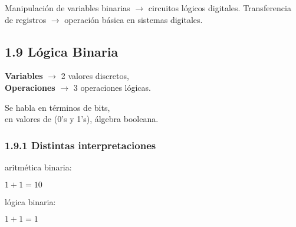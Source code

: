 \documentclass{article}
\begin{document}
Manipulaci\'{o}n de variables binarias $\rightarrow$ circuitos l\'{o}gicos digitales.
\medbreak
Transferencia de registros $\rightarrow$ operaci\'{o}n b\'{a}sica en sistemas digitales.
\medbreak

\subsection*{1.9 L\'{o}gica Binaria}

\begin{center}
    \textbf{Variables} $\rightarrow$ 2 valores discretos, \\
    \textbf{Operaciones} $\rightarrow$ 3 operaciones l\'{o}gicas.
\end{center}
\medbreak

\begin{flushleft}
    Se habla en t\'{e}rminos de bits, \\
    en valores de (0's y 1's), \'{a}lgebra booleana.
\end{flushleft}
\medbreak

\begin{center}
\end{center}

\subsubsection*{1.9.1 Distintas interpretaciones}
\begin{flushleft}
    aritm\'{e}tica binaria: \\
    \begin{center}
        $1 + 1 = 10$
    \end{center}

    l\'{o}gica binaria: \\
    \begin{center}
        $1 + 1 = 1$
    \end{center}
\end{flushleft}
\end{document}
